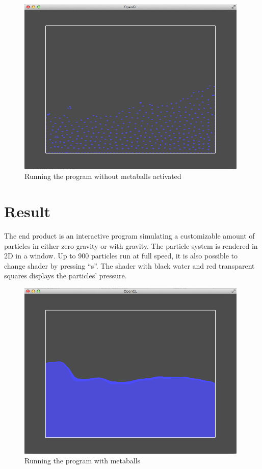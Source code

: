 \documentclass[a4paper,12pt,twoside,final]{report}
\begin{document}
\begin{figure}[H]
\begin{center}
    \includegraphics[width=11cm]{figs/image_2.png} 
\end{center}
\caption{Running the program without metaballs activated}
\label{model_block}
\end{figure}



\chapter{Result}
The end product is an interactive program simulating a customizable amount of particles in either zero gravity or with gravity. The particle system is rendered in 2D in a window. Up to 900 particles run at full speed, it is also possible to change shader by pressing “s”. The shader with black water and red transparent squares displays the particles’ pressure. \\

\begin{figure}[H]
\begin{center}
    \includegraphics[width=11cm]{figs/image_1.png} 
\end{center}
\caption{Running the program with metaballs}
\label{model_block}
\end{figure}
\end{document}
